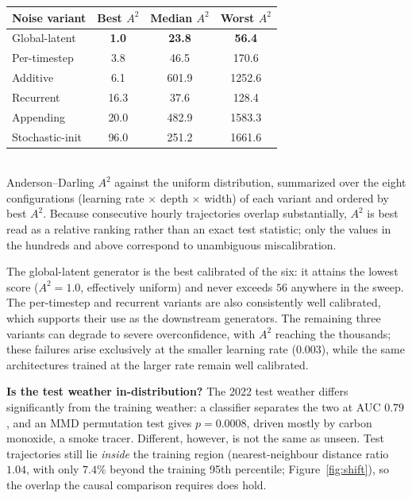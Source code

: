\documentclass[11pt]{article}
\begin{document}
\begin{center}
\begin{tabular}{lccc}
\toprule
Noise variant & Best $A^2$ & Median $A^2$ & Worst $A^2$ \\
\midrule
Global-latent   & \textbf{1.0} & \textbf{23.8} & \textbf{56.4} \\
Per-timestep    & 3.8  & 46.5  & 170.6 \\
Additive        & 6.1  & 601.9 & 1252.6 \\
Recurrent       & 16.3 & 37.6  & 128.4 \\
Appending       & 20.0 & 482.9 & 1583.3 \\
Stochastic-init & 96.0 & 251.2 & 1661.6 \\
\bottomrule
\end{tabular}\\[2pt]
{\footnotesize Anderson--Darling $A^2$ against the uniform distribution, summarized over the
eight configurations (learning rate $\times$ depth $\times$ width) of each variant and
ordered by best $A^2$. Because consecutive hourly trajectories overlap substantially, $A^2$
is best read as a relative ranking rather than an exact test statistic; only the values in
the hundreds and above correspond to unambiguous miscalibration.}
\end{center}

The global-latent generator is the best calibrated of the six: it attains the lowest score
($A^2=1.0$, effectively uniform) and never exceeds $56$ anywhere in the sweep. The
per-timestep and recurrent variants are also consistently well calibrated, which supports
their use as the downstream generators. The remaining three variants can degrade to severe
overconfidence, with $A^2$ reaching the thousands; these failures arise exclusively at the
smaller learning rate ($0.003$), while the same architectures trained at the larger rate
remain well calibrated.

\textbf{Is the test weather in-distribution?} The 2022 test weather differs significantly
from the training weather: a classifier separates the two at AUC $0.79$, and an MMD
permutation test gives $p=0.0008$, driven mostly by carbon monoxide, a smoke tracer.
Different, however, is not the same as unseen. Test trajectories still lie \emph{inside}
the training region (nearest-neighbour distance ratio $1.04$, with only $7.4\%$ beyond the
training 95th percentile; Figure~\ref{fig:shift}), so the overlap the causal comparison
requires does hold.
\end{document}
